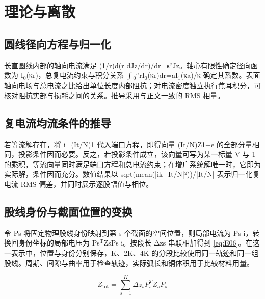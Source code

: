 \appendices
\section{理论与离散}
\label{chapter:S1}

\hypertarget{S1.round_derivation.heading}{}
\subsection{圆线径向方程与归一化}

\hypertarget{S1.round_derivation.p1}{}
长直圆线内部的轴向电流满足 (1/r)d(r dJz/dr)/dr=κ²Jz。轴心有限性确定径向函数为 I\(_0\)(κr)，总复电流约束与积分关系 \(\int\)\(_0\)\(^a\)rI\(_0\)(κr)dr=aI\(_1\)(κa)/κ 确定其系数。表面轴向电场与总电流之比给出单位长度内部阻抗；对电流密度独立执行焦耳积分，可核对阻抗实部与损耗之间的关系。推导采用与正文一致的 RMS 相量。

\hypertarget{S1.sharing_derivation.heading}{}
\subsection{复电流均流条件的推导}

\hypertarget{S1.sharing_derivation.p1}{}
若等流解存在，将 i=(It/N)1 代入端口方程，即得向量 (It/N)Z1+e 的全部分量相同，投影条件因而必要。反之，若投影条件成立，该向量可写为某一标量 V 与 1 的乘积，等流向量同时满足端口方程和总电流约束；在增广系统解唯一时，它即为实际解，条件因而充分。数值结果以 sqrt(mean(|ik−It/N|²))/|It/N| 表示归一化复电流 RMS 偏差，并同时展示逐股幅值与相位。

\hypertarget{S1.dtm_derivation.heading}{}
\subsection{股线身份与截面位置的变换}

\hypertarget{S1.dtm_derivation.p1}{}
令 Ps 将固定物理股线身份映射到第 s 个截面的空间位置，则局部电流为 Ps i，转换回身份坐标的局部电压为 Ps\(^{\mathrm T}\)ZsPs i。按段长 Δzs 串联相加得到 \eqref{eq:E06}。在这一表示中，位置与身份分别保存，K、2K、4K 的分段比较使用同一轨迹和同一组股线。周期、间隙与曲率用于检查轨迹，实际弧长和铜体积用于比较材料用量。

\hypertarget{S1.equation.E06}{}
\hypertarget{E06}{}\begin{equation}Z_{\mathrm{tot}}=\sum_{s=1}^{K}\Delta z_s P_s^T Z_s P_s\tag{7}\label{eq:E06}\end{equation}

